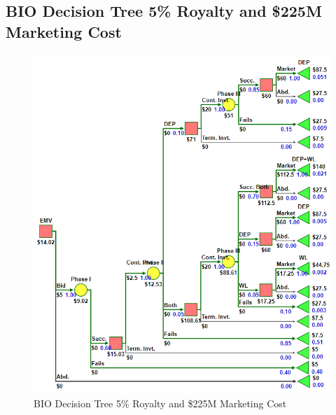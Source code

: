 \documentclass[journal]{IEEEtran}
\begin{document}
\subsection{BIO Decision Tree 5\% Royalty and \$225M Marketing Cost}
\begin{figure}[h]
\centering 
\includegraphics[width = 1.\linewidth]{bio_5_255}
\caption{BIO Decision Tree 5\% Royalty and \$225M Marketing Cost} 
\label{pharma_tree_255} 
\end{figure}
\end{document}
